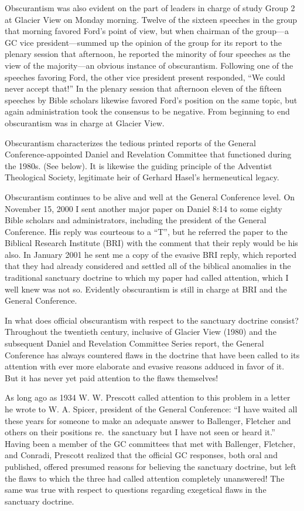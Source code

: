 Obscurantism was also evident on the part of leaders in charge of study
Group 2 at Glacier View on Monday morning. Twelve of the sixteen speeches in
the group that morning favored Ford's point of view, but when chairman of
the group---a GC vice president---summed up the opinion of the group for its
report to the plenary session that afternoon, he reported the minority of
four speeches as the view of the majority---an obvious instance of
obscurantism. Following one of the speeches favoring Ford, the other vice
president present responded, ``We could never accept that!'' In the plenary
session that afternoon eleven of the fifteen speeches by Bible scholars
likewise favored Ford's position on the same topic, but again administration 
took the consensus to be negative. From beginning to end obscurantism was in
charge at Glacier View.

Obscurantism characterizes the tedious printed reports of the General
Conference-appointed Daniel and Revelation Committee that functioned during
the 1980s. (See below). It is likewise the guiding principle of the
Adventist Theological Society, legitimate heir of Gerhard Hasel's
hermeneutical legacy.

Obscurantism continues to be alive and well at the General Conference level.
On November 15, 2000 I sent another major paper on Daniel 8:14 to some
eighty Bible scholars and administrators, including the president of the
General Conference. His reply was courteous to a ``T'', but he referred the
paper to the Biblical Research Institute (BRI) with the comment that their
reply would be his also. In January 2001 he sent me a copy of the evasive
BRI reply, which reported that they had already considered and settled all
of the biblical anomalies in the traditional sanctuary doctrine to which my
paper had called attention, which I well knew was not so. Evidently
obscurantism is still in charge at BRI and the General Conference.

In what does official obscurantism with respect to the sanctuary doctrine
consist? Throughout the twentieth century, inclusive of Glacier View (1980)
and the subsequent Daniel and Revelation Committee Series report, the
General Conference has always countered flaws in the doctrine that have been
called to its attention with ever more elaborate and evasive reasons adduced
in favor of it. But it has never yet paid attention to the flaws themselves!

As long ago as 1934 W. W. Prescott called attention to this problem in a
letter he wrote to W. A. Spicer, president of the General Conference: ``I
have waited all these years for someone to make an adequate answer to
Ballenger, Fletcher and others on their positions re.\ the sanctuary but I
have not seen or heard it.'' Having been a member of the GC committees
that met with Ballenger, Fletcher, and Conradi, Prescott realized that the
official GC responses, both oral and published, offered presumed reasons for
believing the sanctuary doctrine, but left the flaws to which the three had
called attention completely unanswered! The same was true with respect to
questions regarding exegetical flaws in the sanctuary doctrine.
